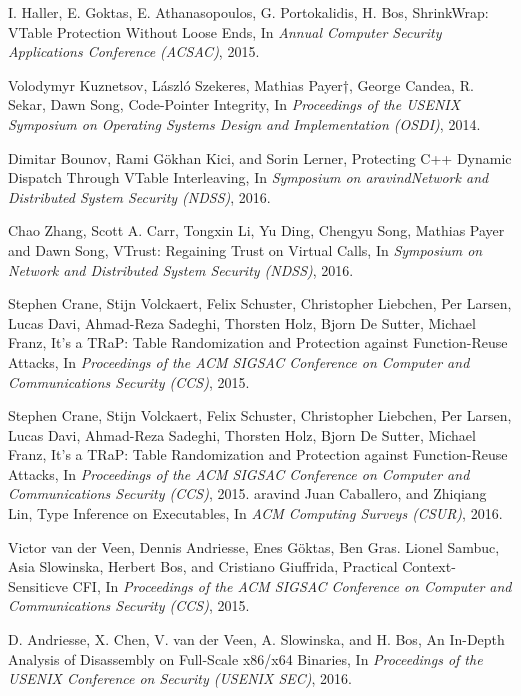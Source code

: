 \documentclass[11pt,a4paper,bibtotoc,idxtotoc,headsepline,footsepline,footexclude,BCOR20mm,DIV10]{scrbook}
\begin{document}
\begin{thebibliography}{50}
I. Haller, E. Goktas, E. Athanasopoulos, G. Portokalidis, H. Bos,
{ ShrinkWrap: VTable Protection Without Loose Ends}, In
\emph{Annual Computer Security Applications Conference (ACSAC)}, 2015.

Volodymyr Kuznetsov, László Szekeres, Mathias Payer†, George Candea, R. Sekar, Dawn Song,
{Code-Pointer Integrity}, In
\emph{Proceedings of the USENIX Symposium on Operating Systems Design and Implementation (OSDI)}, 2014.

Dimitar Bounov, Rami Gökhan Kici, and Sorin Lerner,
{Protecting C++ Dynamic Dispatch Through VTable Interleaving}, In
\emph{Symposium on aravindNetwork and Distributed System Security (NDSS)}, 2016.

Chao Zhang, Scott A. Carr, Tongxin Li, Yu Ding, Chengyu Song, Mathias Payer and Dawn Song,
{VTrust: Regaining Trust on Virtual Calls}, In
\emph{Symposium on Network and Distributed System Security (NDSS)}, 2016.

Stephen Crane, Stijn Volckaert, Felix Schuster, Christopher Liebchen, Per Larsen,
Lucas Davi, Ahmad-Reza Sadeghi, Thorsten Holz, Bjorn De Sutter, Michael Franz,
{It’s a TRaP: Table Randomization and Protection against Function-Reuse Attacks}, In
\emph{Proceedings of the ACM SIGSAC Conference on Computer and Communications Security (CCS)}, 2015.

Stephen Crane, Stijn Volckaert, Felix Schuster, Christopher Liebchen, Per Larsen,
Lucas Davi, Ahmad-Reza Sadeghi, Thorsten Holz, Bjorn De Sutter, Michael Franz,
{It’s a TRaP: Table Randomization and Protection against Function-Reuse Attacks}, In
\emph{Proceedings of the ACM SIGSAC Conference on Computer and Communications Security (CCS)}, 2015.
aravind
Juan Caballero, and Zhiqiang Lin,
{Type Inference on Executables}, In
\emph{ACM Computing Surveys (CSUR)}, 2016.

Victor van der Veen, Dennis Andriesse, Enes Göktas, Ben Gras.
Lionel Sambuc, Asia Slowinska, Herbert Bos, and Cristiano Giuffrida,
{Practical Context-Sensiticve CFI}, In
\emph{Proceedings of the ACM SIGSAC Conference on Computer and Communications Security (CCS)}, 2015.

D. Andriesse, X. Chen, V. van der Veen, A. Slowinska, and H. Bos, 
{An In-Depth Analysis of Disassembly on Full-Scale x86/x64 Binaries}, In
\emph{Proceedings of the USENIX Conference on Security (USENIX SEC)}, 2016.


\end{thebibliography}
\end{document}
